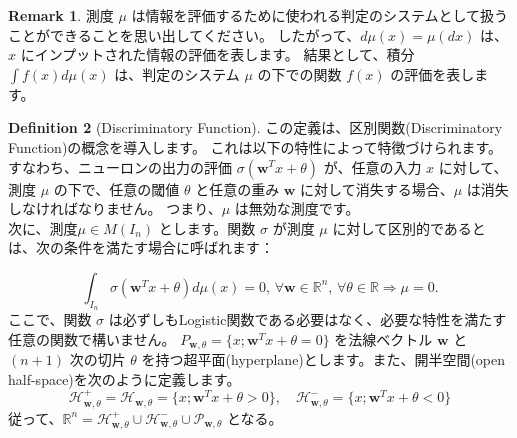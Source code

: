 \documentclass[a4paper]{jsarticle}
\theoremstyle{definition}
\newtheorem{dfn}{Definition}
\newtheorem{rem}[dfn]{Remark}
\begin{document}
\begin{rem}
  測度 $\mu$ は情報を評価するために使われる判定のシステムとして扱うことができることを思い出してください。
  したがって、$d\mu(x) = \mu(dx)$ は、$x$ にインプットされた情報の評価を表します。
  結果として、積分 $\int f(x) d\mu(x)$ は、判定のシステム $\mu$ の下での関数 $f(x)$ の評価を表します。
  
\end{rem}

\begin{dfn}[Discriminatory Function]
  この定義は、区別関数(Discriminatory Function)の概念を導入します。
  これは以下の特性によって特徴づけられます。
  すなわち、ニューロンの出力の評価 $\sigma(\mathbf{w}^T x + \theta)$ が、任意の入力 $x$ に対して、測度 $\mu$ の下で、任意の閾値 $\theta$ と任意の重み $\mathbf{w}$ に対して消失する場合、$\mu$ は消失しなければなりません。
  つまり、$\mu$ は無効な測度です。\\
  次に、測度$\mu \in M(I_n)$ とします。関数 $\sigma$ が測度 $\mu$ に対して区別的であるとは、次の条件を満たす場合に呼ばれます：

  \[
  \int_{I_n} \sigma(\mathbf{w}^T x + \theta)d\mu(x) = 0, \, \forall \mathbf{w} \in \mathbb{R}^n, \, \forall \theta \in \mathbb{R} \Rightarrow \mu = 0.
  \]
  ここで、関数 $\sigma$ は必ずしもLogistic関数である必要はなく、必要な特性を満たす任意の関数で構いません。
  $P_{\mathbf{w},\theta} = \{x; \mathbf{w}^T x + \theta = 0\}$ を法線ベクトル $\mathbf{w}$ と $(n+1)$ 次の切片 $\theta$ を持つ超平面(hyperplane)とします。また、開半空間(open half-space)を次のように定義します。
  \[
  \mathcal{H}_{\mathbf{w},\theta}^+ = \mathcal{H}_{\mathbf{w},\theta} = \{x; \mathbf{w}^T x + \theta > 0\}, \quad \mathcal{H}_{\mathbf{w},\theta}^- = \{x; \mathbf{w}^T x + \theta < 0\}
  \]
従って、$\mathbb{R}^n = \mathcal{H}_{\mathbf{w},\theta}^+ \cup \mathcal{H}_{\mathbf{w},\theta}^- \cup \mathcal{P}_{\mathbf{w},\theta}$ となる。
\end{dfn}
\end{document}
